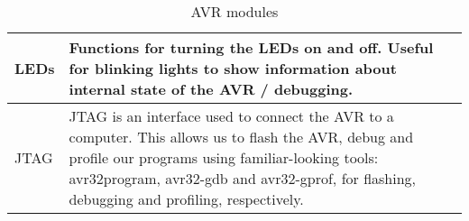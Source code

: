 \begin{table}[htbp]
\begin{tabular}{l|p{10cm}}
  \acp{LED} & Functions for turning the \acp{LED} on and off. Useful for
  blinking lights to show information about internal state of the AVR /
  debugging. \\ \hline
  
  \ac{JTAG} & \ac{JTAG} is an interface used to connect the AVR to a
  computer. This allows us to flash the AVR, debug and profile our programs
  using familiar-looking tools: avr32program, avr32-gdb and avr32-gprof, for
  flashing, debugging and profiling, respectively. \\
  \end{tabular}
  \caption{AVR modules}
  \label{tab:asdasd}
\end{table}

